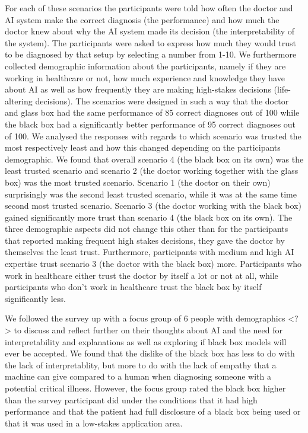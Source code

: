 \documentclass[manuscript,screen,review]{acmart}
\begin{document}
For each of these scenarios the participants were told how often the doctor and AI system make the correct diagnosis (the performance) and how much the doctor knew about why the AI system made its decision (the interpretability of the system). The participants were asked to express how much they would trust to be diagnosed by that setup by selecting a number from 1-10. We furthermore collected demographic information about the participants, namely if they are working in healthcare or not, how much experience and knowledge they have about AI as well as how frequently they are making high-stakes decisions (life-altering decisions). The scenarios were designed in such a way that the doctor and glass box had the same performance of 85 correct diagnoses out of 100 while the black box had a significantly better performance of 95 correct diagnoses out of 100. We analysed the responses with regards to which scenario was trusted the most respectively least and how this changed depending on the participants demographic. We found that overall scenario 4 (the black box on its own) was the least trusted scenario and scenario 2 (the doctor working together with the glass box) was the most trusted scenario. Scenario 1 (the doctor on their own) surprisingly was the second least trusted scenario, while it was at the same time second most trusted scenario. Scenario 3 (the doctor working with the black box) gained significantly more trust than scenario 4 (the black box on its own). The three demographic aspects did not change this other than for the participants that reported making frequent high stakes decisions, they gave the doctor by themselves the least trust. Furthermore, participants with medium and high AI expertise trust scenario 3 (the doctor with the black box) more. Participants who work in healthcare either trust the doctor by itself a lot or not at all, while participants who don’t work in healthcare trust the black box by itself significantly less.

We followed the survey up with a focus group of 6 people with demographics <?> to discuss and reflect further on their thoughts about AI and the need for interpretability and explanations as well as exploring if black box models will ever be accepted. We found that the dislike of the black box has less to do with the lack of interpretablity, but more to do with the lack of empathy that a machine can give compared to a human when diagnosing someone with a potential critical illness. However, the focus group rated the black box higher than the survey participant did under the conditions that it had high performance and that the patient had full disclosure of a black box being used or that it was used in a low-stakes application area.
\end{document}
